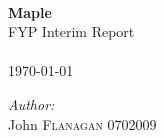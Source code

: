 \begin{titlepage}
 
\begin{center}
 
 
 
 
 
 
\HRule \\[0.6cm]
{ \huge \bfseries Maple}\\FYP Interim Report\\[0.4cm]
 
\HRule \\[4.0cm]
 {\large \today}\\[9.0cm]

\begin{flushleft} \large
\emph{Author:}\\
John \textsc{Flanagan} 0702009
\end{flushleft}

 
\vfill
 

 
\end{center}
 
\end{titlepage}
